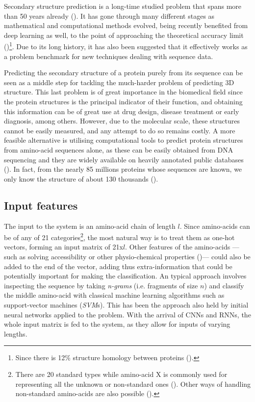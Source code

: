 
Secondary structure prediction is a long-time studied problem that spans more than 50 years already (\cite{Pauling1951}). It has gone through many different stages as mathematical and computational methods evolved, being recently benefited from deep learning as well, to the point of approaching the theoretical accuracy limit (\cite{Heffernan2017})\footnote{Since there is 12\% structure homology between proteins (\cite{Rost2001}).}. Due to its long history, it has also been suggested that it effectively works as a problem benchmark for new techniques dealing with sequence data.

Predicting the secondary structure of a protein purely from its sequence can be seen as a middle step for tackling the much-harder problem of predicting 3D structure. This last problem is of great importance in the biomedical field since the protein structures is the principal indicator of their function, and obtaining this information can be of great use at drug design, disease treatment or early diagnosis, among others. However, due to the molecular scale, these structures cannot be easily measured, and any attempt to do so remains costly. A more feasible alternative is utilising computational tools to predict protein structures from amino-acid sequences alone, as these can be easily obtained from DNA sequencing and they are widely available on heavily annotated public databases (\cite{Dill2012}). In fact, from the nearly 85 millions proteins whose sequences are known, we only know the structure of about 130 thousands (\cite{Hattori2017}).

	\subsection{Input features}
	The input to the system is an amino-acid chain of length $l$. Since amino-acids can be of any of 21 categories\footnote{There are 20 standard types while amino-acid X is commonly used for representing all the unknown or non-standard ones (\cite{Zhou2018}). Other ways of handling non-standard amino-acids are also possible (\cite{Fang2017}).}, the most natural way is to treat them as one-hot vectors, forming an input matrix of 21x$l$. Other features of the amino-acids ---such as solving accessibility or other physio-chemical properties (\cite{Fauchere1988})--- could also be added to the end of the vector, adding thus extra-information that could be potentially important for making the classification. An typical approach involves inspecting the sequence by taking \textit{n-grams} (i.e. fragments of size $n$) and classify the middle amino-acid with classical machine learning algorithms such as support-vector machines (\textit{SVM}s). This has been the approach also held by initial neural networks applied to the problem. With the arrival of CNNs and RNNs, the whole input matrix is fed to the system, as they allow for inputs of varying lengths.
	 

